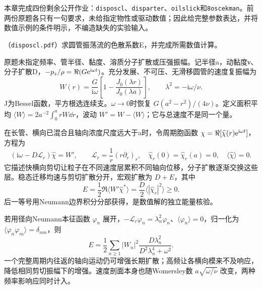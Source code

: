 本章完成四份剩余公开作业：\texttt{disposcl}、\texttt{disparter}、\texttt{oilslick}和\texttt{8oscekman}。前两份原题各只有一句要求，未给指定物性或驱动数值；因此给完整参数表达，并将数值示例的条件明示，不编造缺失的实验输入。

\begin{exercise}\label{task:fluid-disposcl}
（\texttt{disposcl.pdf}）求圆管振荡流的色散系数E，并完成所需数值计算。
\end{exercise}
\begin{solution}
原题未指定频率、管半径、黏度、溶质分子扩散或压强振幅。记半径a，动黏度ν、分子扩散D，$-p_z/\rho=\Re(G\mathrm e^{\mathrm i\omega t})$。充分发展、不可压、无滑移圆管的速度复振幅为
\[
 W(r)=\frac{G}{\mathrm i\omega}
       \left[1-\frac{J_0(\lambda r)}{J_0(\lambda a)}\right],
 \qquad\lambda^2=-\mathrm i\omega/\nu.
\]
J为Bessel函数，平方根选连续支。$\omega\to0$时恢复 $G(a^2-r^2)/(4\nu)$。定义面积平均 $\langle W\rangle=2a^{-2}\int_0^arW\dd r$，波动 $W'=W-\langle W\rangle$；它与总速度不是同一个量。

在长管、横向已混合且轴向浓度尺度远大于a时，令周期胞函数 $\chi=\Re[\widehat\chi(r)\mathrm e^{\mathrm i\omega t}]$，方程为
\[
 (\mathrm i\omega-D\mathcal L_r)\widehat\chi=W',\qquad
 \mathcal L_r=\frac1r(r\partial_r)_r,
 \quad\widehat\chi_r(0)=\widehat\chi_r(a)=0,\quad\langle\widehat\chi\rangle=0.
\]
它描述快横向剪切让粒子在不同速度层累积不同轴向位移，分子扩散逐渐交换这些层。稳态迁移均速与剪切扩散分开，宏观扩散为 $D+E$，其中
\[
 E=\frac12\Re\langle W'\widehat\chi^*\rangle
  =\frac D2\langle|\widehat\chi_r|^2\rangle\ge0.
\]
后一等号用Neumann边界积分分部获得，是数值解的独立能量核验。

若用径向Neumann本征函数 $\varphi_n$ 展开，$-\mathcal L_r\varphi_n=\lambda_n^2\varphi_n$、$\langle\varphi_n\rangle=0$，归一化为 $\langle\varphi_n\varphi_m\rangle=\delta_{nm}$，则
\[
 E=\frac12\sum_{n\ge1}|W_n|^2
             \frac{D\lambda_n^2}{D^2\lambda_n^4+\omega^2}.
\]
一个完整周期内往返的轴向运动仍可增强长期扩散；高频让各横向模来不及响应，降低相同剪切振幅下的增强。速度剖面本身也随Womersley数 $a\sqrt{\omega/\nu}$ 改变，两种频率影响应同时计入。


\end{solution}
